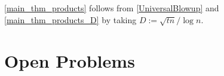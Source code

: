 \documentclass{patmorin}
\renewcommand{\ge}{\geqslant}
\begin{document}
\cref{main_thm_products} follows from \cref{UniversalBlowup} and \cref{main_thm_products_D} by taking $D:=\sqrt{tn}/\log n$.



\section{Open Problems}

%
%
%
\end{document}
